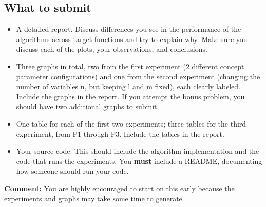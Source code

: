 \subsection*{What to submit}
\begin{itemize}

\item A detailed report. Discuss differences you see in the
performance of the algorithms across target functions and try to
explain why. Make sure you discuss each of the plots, your
observations, and conclusions.

\item Three graphs in total, two from the first experiment (2 different concept parameter configurations) and one from the second experiment (changing the
number of variables n, but keeping l and m fixed), each clearly
labeled. Include the graphs in the report. If you attempt the bonus problem, you 
should have two additional graphs to submit.

\item One table for each of the first two experiments; three tables for the third experiment, from P1 through P3. Include the tables in the report.

\item Your source code. This should include the algorithm implementation and the code that runs the experiments. You {\bf must} include a README, documenting how someone should run your code.
\end{itemize}
{\bf Comment:} You are highly encouraged to start on this early because the
experiments and graphs may take some time to generate.


